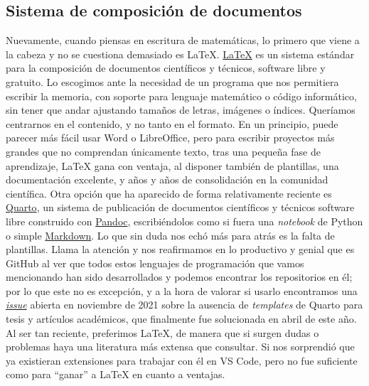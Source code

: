 \subsection{Sistema de composición de documentos}
Nuevamente, cuando piensas en escritura de matemáticas, lo primero que viene a la cabeza y no se cuestiona 
demasiado es LaTeX. \href{https://www.latex-project.org/}{LaTeX} es un sistema estándar para la composición de documentos 
científicos y técnicos, software libre y gratuito. Lo escogimos ante la necesidad de un programa que nos 
permitiera escribir la memoria, con soporte para lenguaje matemático o código informático, sin tener que 
andar ajustando tamaños de letras, imágenes o índices. Queríamos centrarnos en el contenido, y no tanto 
en el formato. En un principio, puede parecer más fácil usar Word o LibreOffice, pero para escribir proyectos 
más grandes que no comprendan únicamente texto, tras una pequeña fase de aprendizaje, LaTeX gana con ventaja, 
al disponer también de plantillas, una documentación excelente, y años y años de consolidación en la comunidad 
científica. Otra opción que ha aparecido de forma relativamente reciente es \href{https://quarto.org/docs/output-formats/pdf-engine.html}{Quarto},
un sistema de publicación de documentos científicos y técnicos software libre construido con
\href{https://pandoc.org/}{Pandoc}, escribiéndolos como si fuera una \textit{notebook} de Python o simple \href{https://markdown.es/}{Markdown}. 
Lo que sin duda nos echó más para atrás es la falta de plantillas. Llama la atención y nos reafirmamos 
en lo productivo y genial que es GitHub al ver que todos estos lenguajes de programación que vamos 
mencionando han sido desarrollados y podemos encontrar los repositorios en él; por lo que este no 
es excepción, y a la hora de valorar si usarlo encontramos una 
\href{https://github.com/quarto-dev/quarto-cli/issues/170}{\textit{issue}} abierta en noviembre 
de 2021 sobre la ausencia de \textit{templates} de Quarto para tesis y artículos académicos, que 
finalmente fue solucionada en abril de este año. Al ser tan reciente, preferimos LaTeX, de manera que 
si surgen dudas o problemas haya una literatura más extensa que consultar. Si nos sorprendió que ya 
existieran extensiones para trabajar con él en VS Code, pero no fue suficiente como para ``ganar'' a LaTeX 
en cuanto a ventajas.

